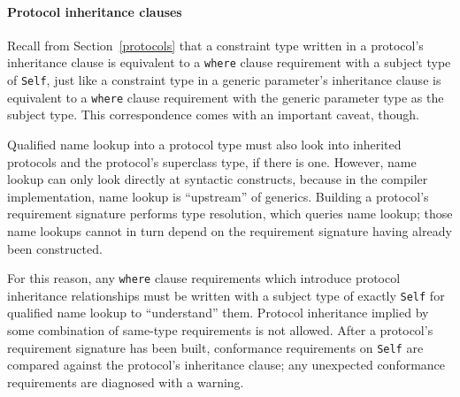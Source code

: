\documentclass[a4paper,headsepline,bibliography=totoc,toc=flat,fleqn,twoside=semi]{scrbook}
\theoremstyle{definition}
\theoremstyle{definition}
\theoremstyle{definition}
\begin{document}
\paragraph{Protocol inheritance clauses}
Recall from Section~\ref{protocols} that a constraint type written in a protocol's inheritance clause is equivalent to a \texttt{where} clause requirement with a subject type of \texttt{Self}, just like a constraint type in a generic parameter's inheritance clause is equivalent to a \texttt{where} clause requirement with the generic parameter type as the subject type. This correspondence comes with an important caveat, though.

Qualified name lookup into a protocol type must also look into inherited protocols and the protocol's superclass type, if there is one. However, name lookup can only look directly at syntactic constructs, because in the compiler implementation, name lookup is ``upstream'' of generics. Building a protocol's requirement signature performs type resolution, which queries name lookup; those name lookups cannot in turn depend on the requirement signature having already been constructed.

For this reason, any \texttt{where} clause requirements which introduce protocol inheritance relationships must be written with a subject type of exactly \texttt{Self} for qualified name lookup to ``understand'' them. Protocol inheritance implied by some combination of same-type requirements is not allowed. After a protocol's requirement signature has been built, conformance requirements on \texttt{Self} are compared against the protocol's inheritance clause; any unexpected conformance requirements are diagnosed with a warning.
\end{document}
